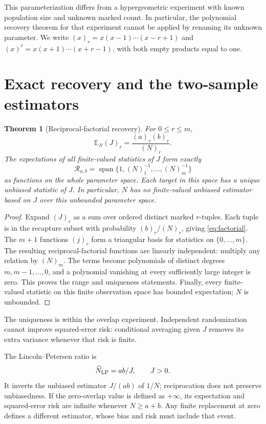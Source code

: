 \documentclass[11pt]{article}
\newtheorem{theorem}{Theorem}[section]
\theoremstyle{remark}\newtheorem{remark}[theorem]{Remark}
\newcommand{\E}{\mathbb E}\newcommand{\PP}{\mathbb P}
\newcommand{\fall}[2]{(#1)_{#2}}\newcommand{\rise}[2]{(#1)^{\overline{#2}}}
\begin{document}
This parameterization differs from a hypergeometric experiment with known
population size and unknown marked count. In particular, the polynomial
recovery theorem for that experiment cannot be applied by renaming its
unknown parameter. We write $\fall{x}{r}=x(x-1)\cdots(x-r+1)$ and
$\rise{x}{r}=x(x+1)\cdots(x+r-1)$, with both empty products equal to one.

\section{Exact recovery and the two-sample estimators}
\begin{theorem}[Reciprocal-factorial recovery]\label{thm:range}
For $0\le r\le m$,
\begin{equation}\label{eq:factorial}
 \E_N\fall{J}{r}=\frac{\fall{a}{r}\fall{b}{r}}{\fall{N}{r}}.
\end{equation}
The expectations of all finite-valued statistics of $J$ form exactly
\[
 \mathcal R_{a,b}=\operatorname{span}\{1,\fall{N}{1}^{-1},\ldots,
 \fall{N}{m}^{-1}\}
\]
as functions on the whole parameter space. Each target in this space has a
unique unbiased statistic of $J$. In particular, $N$ has no finite-valued
unbiased estimator based on $J$ over this unbounded parameter space.
\end{theorem}
\begin{proof}
Expand $\fall{J}{r}$ as a sum over ordered distinct marked $r$-tuples.
Each tuple is in the recapture subset with probability
$\fall{b}{r}/\fall{N}{r}$, giving \eqref{eq:factorial}.
The $m+1$ functions $\fall{j}{r}$ form a triangular basis for statistics on
$\{0,\ldots,m\}$. The resulting reciprocal-factorial functions are linearly
independent: multiply any relation by $\fall{N}{m}$. The terms become
polynomials of distinct degrees $m,m-1,\ldots,0$, and a polynomial vanishing
at every sufficiently large integer is zero. This proves the range and
uniqueness statements. Finally, every finite-valued statistic on this finite
observation space has bounded expectation; $N$ is unbounded.
\end{proof}
The uniqueness is within the overlap experiment. Independent randomization
cannot improve squared-error risk: conditional averaging given $J$ removes
its extra variance whenever that risk is finite.

The Lincoln--Petersen ratio \cite{Chapman1951,Dettloff2023} is
\begin{equation}\label{eq:LP}
 \widehat N_{\rm LP}=ab/J,\qquad J>0.
\end{equation}
It inverts the unbiased estimator $J/(ab)$ of $1/N$; reciprocation does not
preserve unbiasedness. If the zero-overlap value is defined as $+\infty$,
its expectation and squared-error risk are infinite whenever $N\ge a+b$.
Any finite replacement at zero defines a different estimator, whose bias
and risk must include that event.
\end{document}
